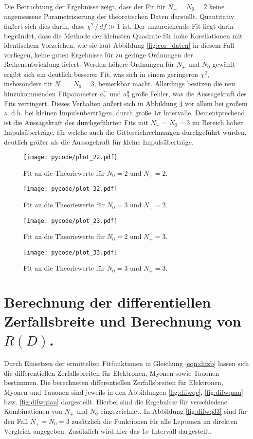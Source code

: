 Die Betrachtung der Ergebnisse zeigt, dass der Fit für $N_+ = N_0 = \num{2}$ keine angemessene Parametrisierung der theoretischen Daten darstellt.
Quantitativ äußert sich dies darin, dass $\chi^2 \,/\, df \gg \num{1}$ ist.
Der unzureichende Fit liegt darin begründet, dass die Methode der kleinsten Quadrate für hohe Korellationen mit identischem Vorzeichen, wie sie laut Abbildung \ref{fig:cor_daten} in diesem Fall vorliegen, keine guten Ergebnisse für zu geringe Ordnungen der Reihenentwicklung liefert.
Werden höhere Ordnungen für $N_+$ und $N_0$ gewählt ergibt sich ein deutlich besserer Fit, was sich in einem geringeren $\chi^2$, insbesondere für $N_+=N_0=\num{3}$, bemerkbar macht.
Allerdings besitzen die neu hinzukommenden Fitparameter $a_2^+$ und $a_2^0$ große Fehler, was die Aussagekraft des Fits verringert.
Dieses Verhalten äußert sich in Abbildung \ref{fig:fit33} vor allem bei großem $z$, d.h. bei kleinen Impulsüberträgen, durch große $\num{1}\sigma$ Intervalle.
Dementprechend ist die Aussagekraft des durchgeführten Fits mit $N_+=N_0=\num{3}$ im Bereich hoher Impulsüberträge, für welche auch die Gittereichrechnungen durchgeführt wurden, deutlich größer als die Aussagekraft für kleine Impulsüberträge.

\begin{figure}
  \centering
  \texttt{[image: pycode/plot\_22.pdf]}
  \caption{Fit an die Theoriewerte für $N_0 = \num{2}$ und $N_+ = \num{2}$.}
  \label{fig:fit22}
\end{figure}
\begin{figure}
  \centering
  \texttt{[image: pycode/plot\_32.pdf]}
  \caption{Fit an die Theoriewerte für $N_0 = \num{3}$ und $N_+ = \num{2}$.}
  \label{fig:fit32}
\end{figure}
\begin{figure}
  \centering
  \texttt{[image: pycode/plot\_23.pdf]}
  \caption{Fit an die Theoriewerte für $N_0 = \num{2}$ und $N_+ = \num{3}$.}
  \label{fig:fit23}
\end{figure}
\begin{figure}
  \centering
  \texttt{[image: pycode/plot\_33.pdf]}
  \caption{Fit an die Theoriewerte für $N_0 = \num{3}$ und $N_+ = \num{3}$.}
  \label{fig:fit33}
\end{figure}

\section{Berechnung der differentiellen Zerfallsbreite und Berechnung von \texorpdfstring{$R(D)$}{R(D)}.}
Durch Einsetzen der ermittelten Fitfunktionen in Gleichung \eqref{eqn:difzb} lassen sich die differentiellen Zerfallsbreiten für Elektronen, Myonen sowie Tauonen bestimmen.
Die berechneten differentiellen Zerfallsbreiten für Elektronen, Myonen und Tauonen sind jeweils in den Abbildungen \ref{fig:difwqe}, \ref{fig:difwqmu} bzw. \ref{fig:difwqtau} dargestellt.
Hierbei sind die Ergebnisse für verschiedene Kombinationen von $N_+$ und $N_0$ eingezeichnet.
In Abbildung \ref{fig:difwq33} sind für den Fall $N_+=N_0=\num{3}$ zusätzlich die Funktionen für alle Leptonen im direkten Vergleich angegeben.
Zusätzlich wird hier das $\num{1}\sigma$ Intervall dargestellt.

